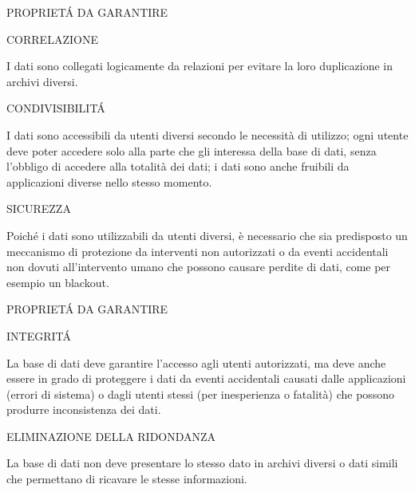 \documentclass[aspectratio=1610]{beamer}
\begin{document}
\begin{frame}{PROPRIET\'A DA GARANTIRE}
    \begin{alertblock}{CORRELAZIONE}
        \begin{minipage}{0.98\linewidth}
            \justifying
            I dati sono collegati logicamente da relazioni per evitare la loro duplicazione 
            in archivi diversi.
        \end{minipage}
    \end{alertblock}
    \pause
    \begin{alertblock}{CONDIVISIBILIT\'A}
        \begin{minipage}{0.98\linewidth}
            \justifying
            I dati sono accessibili da utenti diversi secondo le necessità di utilizzo; ogni 
            utente deve poter accedere solo alla parte che gli interessa della base di 
            dati, senza l’obbligo di accedere alla totalità dei dati; i dati sono anche fruibili 
            da applicazioni diverse nello stesso momento.
        \end{minipage}
    \end{alertblock}
    \pause
    \begin{alertblock}{SICUREZZA}
        \begin{minipage}{0.98\linewidth}
            \justifying
            Poiché i dati sono utilizzabili da utenti diversi, è necessario che sia
            predisposto un meccanismo di protezione da interventi non autorizzati o da
            eventi accidentali non dovuti all’intervento umano che possono causare
            perdite di dati, come per esempio un blackout.
        \end{minipage}
    \end{alertblock}
\end{frame}

\begin{frame}{PROPRIET\'A DA GARANTIRE}
    \begin{alertblock}{INTEGRIT\'A}
        \begin{minipage}{0.98\linewidth}
            \justifying
            La base di dati deve garantire l’accesso agli utenti autorizzati, ma deve
            anche essere in grado di proteggere i dati da eventi accidentali causati dalle
            applicazioni (errori di sistema) o dagli utenti stessi (per inesperienza o
            fatalità) che possono produrre inconsistenza dei dati.
        \end{minipage}
    \end{alertblock}
    \pause
    \begin{alertblock}{ELIMINAZIONE DELLA RIDONDANZA}
        \begin{minipage}{0.98\linewidth}
            \justifying
            La base di dati non deve presentare lo stesso dato in archivi diversi o dati 
            simili che permettano di ricavare le stesse informazioni.
        \end{minipage}
    \end{alertblock}
\end{frame}
\end{document}
